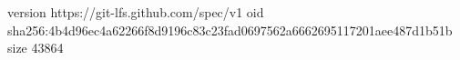 version https://git-lfs.github.com/spec/v1
oid sha256:4b4d96ec4a62266f8d9196c83c23fad0697562a6662695117201aee487d1b51b
size 43864
